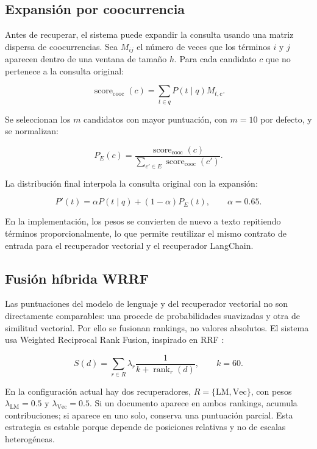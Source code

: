 \documentclass[a4paper]{llncs}
\begin{document}
\subsection{Expansión por coocurrencia}

Antes de recuperar, el sistema puede expandir la consulta usando una matriz dispersa de coocurrencias. Sea $M_{ij}$ el número de veces que los términos $i$ y $j$ aparecen dentro de una ventana de tamaño $h$. Para cada candidato $c$ que no pertenece a la consulta original:

\begin{equation}
\operatorname{score}_{\mathrm{cooc}}(c)=
\sum_{t\in q} P(t\mid q)M_{t,c}.
\end{equation}

Se seleccionan los $m$ candidatos con mayor puntuación, con $m=10$ por defecto, y se normalizan:

\begin{equation}
P_E(c)=
\frac{\operatorname{score}_{\mathrm{cooc}}(c)}
{\sum_{c'\in E}\operatorname{score}_{\mathrm{cooc}}(c')}.
\end{equation}

La distribución final interpola la consulta original con la expansión:

\begin{equation}
P'(t)=\alpha P(t\mid q)+(1-\alpha)P_E(t),
\qquad \alpha=0.65.
\end{equation}

En la implementación, los pesos se convierten de nuevo a texto repitiendo términos proporcionalmente, lo que permite reutilizar el mismo contrato de entrada para el recuperador vectorial y el recuperador LangChain.

\subsection{Fusión híbrida WRRF}

Las puntuaciones del modelo de lenguaje y del recuperador vectorial no son directamente comparables: una procede de probabilidades suavizadas y otra de similitud vectorial. Por ello se fusionan rankings, no valores absolutos. El sistema usa Weighted Reciprocal Rank Fusion, inspirado en RRF \cite{cormack2009reciprocal}:

\begin{equation}
S(d)=\sum_{r\in R} \lambda_r
\frac{1}{k+\operatorname{rank}_r(d)},
\qquad k=60.
\end{equation}

En la configuración actual hay dos recuperadores, $R=\{\mathrm{LM},\mathrm{Vec}\}$, con pesos $\lambda_{\mathrm{LM}}=0.5$ y $\lambda_{\mathrm{Vec}}=0.5$. Si un documento aparece en ambos rankings, acumula contribuciones; si aparece en uno solo, conserva una puntuación parcial. Esta estrategia es estable porque depende de posiciones relativas y no de escalas heterogéneas.
\end{document}
